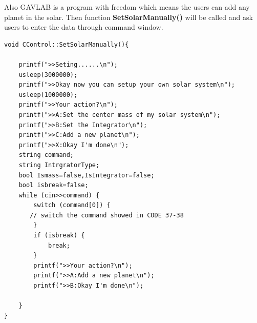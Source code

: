 \documentclass[12pt]{article}
\begin{document}
Also GAVLAB is a program with freedom which means the users can add any planet in the solar.
Then function \textbf{SetSolarManually()} will be called and ask users to enter the data through
command window.

\begin{lstlisting}[caption=SetSolarManually()]
void CControl::SetSolarManually(){
    
    printf(">>Seting......\n");
    usleep(3000000);
    printf(">>Okay now you can setup your own solar system\n");
    usleep(1000000);
    printf(">>Your action?\n");
    printf(">>A:Set the center mass of my solar system\n");
    printf(">>B:Set the Integrator\n");
    printf(">>C:Add a new planet\n");
    printf(">>X:Okay I'm done\n");
    string command;
    string IntrgratorType;
    bool Ismass=false,IsIntegrator=false;
    bool isbreak=false;
    while (cin>>command) {
        switch (command[0]) {
       // switch the command showed in CODE 37-38
        }
        if (isbreak) {
            break;
        }
        printf(">>Your action?\n");
        printf(">>A:Add a new planet\n");
        printf(">>B:Okay I'm done\n");
        
    }
}
\end{lstlisting}
\clearpage
\end{document}
